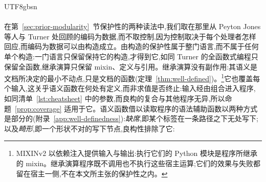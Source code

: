 \begin{CJK*}{UTF8}{gbsn}
\paragraph{}
\ifPaperChinese
在第~\ref{sec:prior-modularity}~节保护性的两种读法中,我们取在那里从 Peyton Jones 等人与 Turner 处回顾的编码为数据,而不取控制,因为控制取决于每个处理者怎样回应,而编码为数据可以由构造成立。由构造的保护性属于整门语言,而不属于任何单个构造:一门语言只保留保持它的构造,才得到它,如同 Turner 的全函数式编程只保留全函数,继承演算只保留 mixin、定义与引用。继承演算没有副作用:其语义是文档所决定的最小不动点,只是文档的函数(定理~\ref{thm:well-defined})。\footnote{MIXINv2 以依赖注入提供输入与输出:执行它们的 Python 模块是程序所继承的 mixin。继承演算程序既不调用也不执行这些宿主运算;它们的效果与失败都留在宿主一侧,不在本文所主张的保护性之内。}它也覆盖每个输入,这关乎语义函数在何处有定义,而非求值是否终止:输入经由组合进入程序,如同清单~\ref{lst:cheatsheet} 中的参数,而良构的复合与其他程序无异,所以命题~\ref{prop:coverage} 适用于它。语义函数借以读取程序的语法辅助函数以两种方式是部分的(附录~\ref{app:well-definedness}):\emph{缺席},即某个标签在一条路径之下无处写下;以及\emph{畸形},即一个形状不对的写下节点,良构性排除了它:

\end{CJK*}
